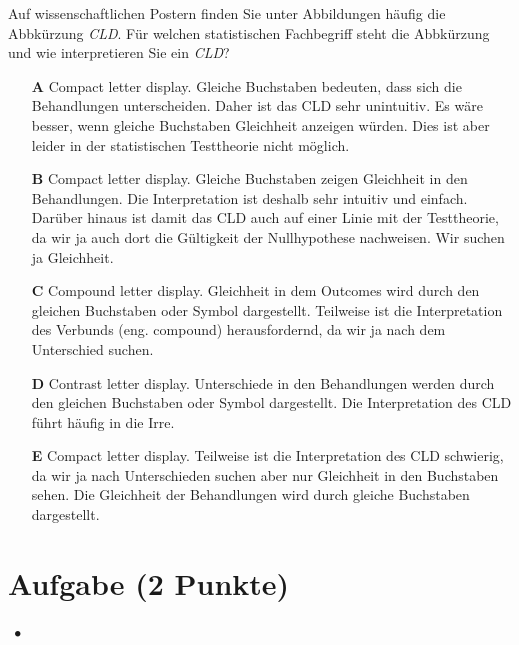 \documentclass[a4paper, 9pt]{scrartcl}\usepackage[]{graphicx}\usepackage[]{xcolor}
\begin{document}
Auf wissenschaftlichen Postern finden Sie unter Abbildungen häufig die Abbkürzung \textit{CLD}. Für welchen statistischen Fachbegriff steht die Abbkürzung und wie interpretieren Sie ein \textit{CLD}?



\begin{enumerate}
\item [\textbf{A} \msquare] Compact letter display. Gleiche Buchstaben bedeuten, dass sich die Behandlungen unterscheiden. Daher ist das CLD sehr unintuitiv. Es wäre besser, wenn gleiche Buchstaben Gleichheit anzeigen würden. Dies ist aber leider in der statistischen Testtheorie nicht möglich.
\item [\textbf{B} \msquare] Compact letter display. Gleiche Buchstaben zeigen Gleichheit in den Behandlungen. Die Interpretation ist deshalb sehr intuitiv und einfach. Darüber hinaus ist damit das CLD auch auf einer Linie mit der Testtheorie, da wir ja auch dort die Gültigkeit der Nullhypothese nachweisen. Wir suchen ja Gleichheit.
\item [\textbf{C} \msquare] Compound letter display. Gleichheit in dem Outcomes wird durch den gleichen Buchstaben oder Symbol dargestellt. Teilweise ist die Interpretation des Verbunds (eng. compound) herausfordernd, da wir ja nach dem Unterschied suchen.
\item [\textbf{D} \msquare] Contrast letter display. Unterschiede in den Behandlungen werden durch den gleichen Buchstaben oder Symbol dargestellt. Die Interpretation des CLD führt häufig in die Irre.
\item [\textbf{E} \msquare] Compact letter display. Teilweise ist die Interpretation des CLD schwierig, da wir ja nach Unterschieden suchen aber nur Gleichheit in den Buchstaben sehen. Die Gleichheit der Behandlungen wird durch gleiche Buchstaben dargestellt.
\end{enumerate}

\section{Aufgabe \hfill (2 Punkte)}

\ifcollection
\begin{flushright}
\tiny\vspace{-2Ex}
\textbf{\examinhaltstart}
\exammodulestatversuch $\;\bullet$
\exammodulebiostat
\vspace{-1Ex}
\end{flushright}
\fi
\end{document}
